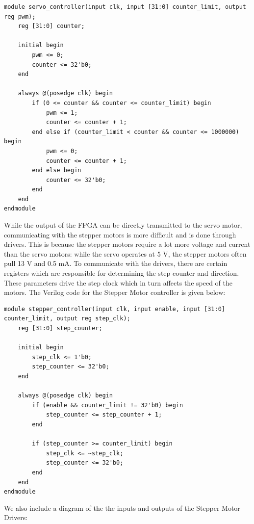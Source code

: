 \documentclass[12pt]{article}
\begin{document}
\begin{lstlisting}[style=myVerilog, caption={The Servo Motor Controller}]
module servo_controller(input clk, input [31:0] counter_limit, output reg pwm);
	reg [31:0] counter;
	
	initial begin
		pwm <= 0;
		counter <= 32'b0;
	end
	
	always @(posedge clk) begin
		if (0 <= counter && counter <= counter_limit) begin
			pwm <= 1;
			counter <= counter + 1;
		end else if (counter_limit < counter && counter <= 1000000) begin
			pwm <= 0;
			counter <= counter + 1;
		end else begin
			counter <= 32'b0;
		end
	end
endmodule
\end{lstlisting}

While the output of the FPGA can be directly transmitted to the servo motor, communicating with the stepper motors is more difficult and is done through drivers. This is because the stepper motors require a lot more voltage and current than the servo motors: while the servo operates at 5 V, the stepper motors often pull 13 V and 0.5 mA. To communicate with the drivers, there are certain registers which are responsible for determining the step counter and direction. These parameters drive the step clock which in turn affects the speed of the motors. The Verilog code for the Stepper Motor controller is given below:

\begin{lstlisting}[style=myVerilog, caption={The Stepper Motor Controller}]
module stepper_controller(input clk, input enable, input [31:0] counter_limit, output reg step_clk);
	reg [31:0] step_counter;
	
	initial begin
		step_clk <= 1'b0;
		step_counter <= 32'b0;
	end
	
	always @(posedge clk) begin
		if (enable && counter_limit != 32'b0) begin
			step_counter <= step_counter + 1;
		end
		
		if (step_counter >= counter_limit) begin
			step_clk <= ~step_clk;
			step_counter <= 32'b0;
		end
	end
endmodule
\end{lstlisting}

We also include a diagram of the the inputs and outputs of the Stepper Motor Drivers:
\end{document}
